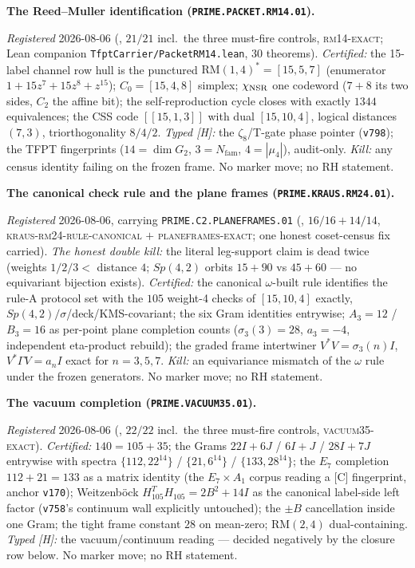 \documentclass[11pt,a4paper]{article}
\newcommand{\Nfam}{N_{\mathrm{fam}}}
\begin{document}
\par\smallskip\noindent\textbf{The Reed--Muller identification
(\texttt{PRIME.PACKET.RM14.01}).}
{\sloppy
\emph{Registered} 2026-08-06
(, $21/21$ incl.\ the three
must-fire controls, \textsc{rm14-exact}; Lean companion
\texttt{TfptCarrier/PacketRM14.lean}, $30$ theorems).
\emph{Certified:} the 15-label channel row hull is the punctured
$\mathrm{RM}(1,4)^*=[15,5,7]$ (enumerator
$1+15z^7+15z^8+z^{15}$); $C_0=[15,4,8]$ simplex;
$\chi_{\rm NSR}$ one codeword ($7{+}8$ its two sides, $C_2$ the
affine bit); the self-reproduction cycle closes with exactly
$1344$ equivalences; the CSS code $[[15,1,3]]$ with dual
$[15,10,4]$, logical distances $(7,3)$, triorthogonality $8/4/2$.
\emph{Typed [H]:} the $\zeta_8$/T-gate phase pointer
(\texttt{v798}); the TFPT fingerprints ($14=\dim G_2$, $3=\Nfam$,
$4=|\mu_4|$), audit-only.  \emph{Kill:} any census identity
failing on the frozen frame.  No marker move; no RH
statement.\par}

\par\smallskip\noindent\textbf{The canonical check rule and the
plane frames (\texttt{PRIME.KRAUS.RM24.01}).}
{\sloppy
\emph{Registered} 2026-08-06, carrying
\texttt{PRIME.C2.PLANEFRAMES.01}
(, $16/16+14/14$,
\textsc{kraus-rm24-rule-canonical} $+$ \textsc{planeframes-exact};
one honest coset-census fix carried).  \emph{The honest double
kill:} the literal leg-support claim is dead twice (weights
$1/2/3<$ distance $4$; $Sp(4,2)$ orbits $15{+}90$ vs $45{+}60$
--- no equivariant bijection exists).  \emph{Certified:} the
canonical $\omega$-built rule identifies the rule-A protocol set
with the $105$ weight-4 checks of $[15,10,4]$ exactly,
$Sp(4,2)/\sigma$/deck/KMS-covariant; the six Gram identities
entrywise; $A_3=12$ / $B_3=16$ as per-point plane completion
counts ($\sigma_3(3)=28$, $a_3=-4$, independent eta-product
rebuild); the graded frame intertwiner $V^*V=\sigma_3(n)I$,
$V^*\Gamma V=a_nI$ exact for $n=3,5,7$.  \emph{Kill:} an
equivariance mismatch of the $\omega$ rule under the frozen
generators.  No marker move; no RH statement.\par}

\par\smallskip\noindent\textbf{The vacuum completion
(\texttt{PRIME.VACUUM35.01}).}
{\sloppy
\emph{Registered} 2026-08-06
(, $22/22$ incl.\ the three
must-fire controls, \textsc{vacuum35-exact}).  \emph{Certified:}
$140=105+35$; the Grams $22I{+}6J$ / $6I{+}J$ / $28I{+}7J$
entrywise with spectra $\{112,22^{14}\}$ / $\{21,6^{14}\}$ /
$\{133,28^{14}\}$; the $E_7$ completion $112+21=133$ as a matrix
identity (the $E_7\times A_1$ corpus reading a [C] fingerprint,
anchor \texttt{v170}); Weitzenb\"ock
$H_{105}^TH_{105}=2B^2+14I$ as the canonical label-side left
factor (\texttt{v758}'s continuum wall explicitly untouched); the
$\pm B$ cancellation inside one Gram; the tight frame constant
$28$ on mean-zero; $\mathrm{RM}(2,4)$ dual-containing.
\emph{Typed [H]:} the vacuum/continuum reading --- decided
negatively by the closure row below.  No marker move; no RH
statement.\par}
\end{document}
